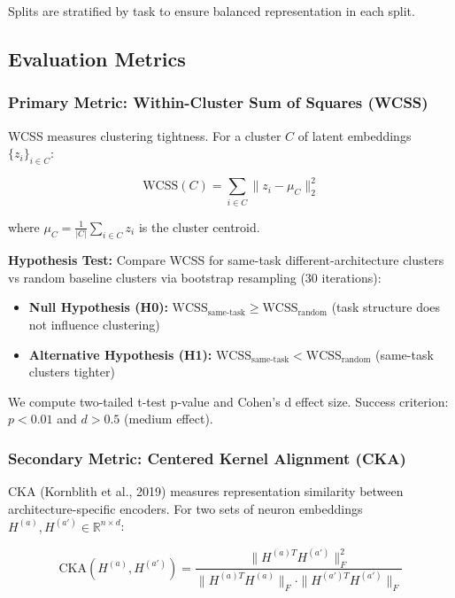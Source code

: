 Splits are stratified by task to ensure balanced representation in each split.

\subsection{Evaluation Metrics}

\subsubsection{Primary Metric: Within-Cluster Sum of Squares (WCSS)}

WCSS measures clustering tightness. For a cluster $C$ of latent embeddings $\{z_i\}_{i \in C}$:

\begin{equation}
\text{WCSS}(C) = \sum_{i \in C} \| z_i - \mu_C \|_2^2
\end{equation}

where $\mu_C = \frac{1}{|C|} \sum_{i \in C} z_i$ is the cluster centroid.

\textbf{Hypothesis Test:} Compare WCSS for same-task different-architecture clusters vs random baseline clusters via bootstrap resampling (30 iterations):

\begin{itemize}
\item \textbf{Null Hypothesis (H0):} $\text{WCSS}_{\text{same-task}} \geq \text{WCSS}_{\text{random}}$ (task structure does not influence clustering)
\item \textbf{Alternative Hypothesis (H1):} $\text{WCSS}_{\text{same-task}} < \text{WCSS}_{\text{random}}$ (same-task clusters tighter)
\end{itemize}

We compute two-tailed t-test p-value and Cohen's d effect size. Success criterion: $p < 0.01$ and $d > 0.5$ (medium effect).

\subsubsection{Secondary Metric: Centered Kernel Alignment (CKA)}

CKA (Kornblith et al., 2019) measures representation similarity between architecture-specific encoders. For two sets of neuron embeddings $H^{(a)}, H^{(a')} \in \mathbb{R}^{n \times d}$:

\begin{equation}
\text{CKA}(H^{(a)}, H^{(a')}) = \frac{\| H^{(a)T} H^{(a')} \|_F^2}{\| H^{(a)T} H^{(a)} \|_F \cdot \| H^{(a')T} H^{(a')} \|_F}
\end{equation}

